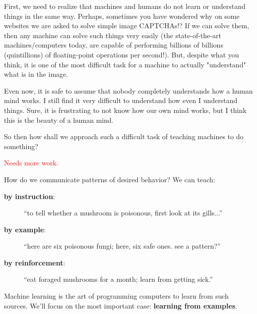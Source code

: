

  First, we need to realize that machines and humans do not learn or understand things in the same way. Perhaps, sometimes you have wondered why on some websites we are asked to solve simple image CAPTCHAs!? If we can solve them, then any machine can solve such things very easily (the state-of-the-art machines/computers today, are capable of performing billions of billions (quintillions) of floating-point operations per second!). But, despite what you think, it is one of the most difficult task for a machine to actually "understand" what is in the image.

  Even now, it is safe to assume that nobody completely understands how a human mind works. I still find it very difficult to understand how even I understand things. Sure, it is frustrating to not know how our own mind works, but I think this is the beauty of a human mind.

  So then how shall we approach such a difficult task of teaching machines to do something?

  \textcolor{red}{Needs more work.}

  How do we communicate patterns of desired behavior?  We can teach:
  \begin{description}
    \item[\textbf{by instruction}:  ]  ``to tell whether a mushroom is poisonous, first look at its gills...''
    \item[\textbf{by example}:      ]  ``here are six poisonous fungi; here, six safe ones.  see a pattern?''
    \item[\textbf{by reinforcement}:]  ``eat foraged mushrooms for a month; learn from getting sick.''
  \end{description}
  Machine learning is the art of programming computers to learn from such
  sources.  We'll focus on the most important case: \textbf{learning from
  examples}.

